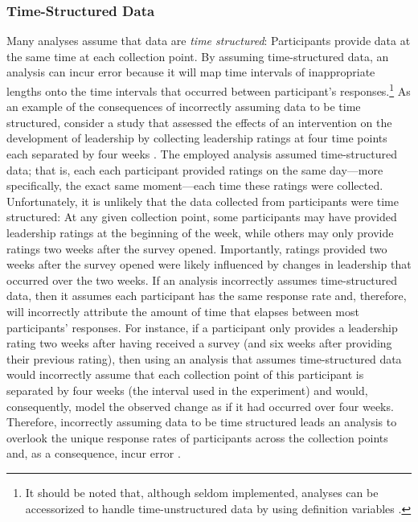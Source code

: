 \documentclass[
12pt, %
twoside,
english]{guelphthesis}
\begin{document}
\hypertarget{time-structured-data}{%
\subsubsection{Time-Structured Data}\label{time-structured-data}}

Many analyses assume that data are \emph{time structured}: Participants provide data at the same time at each collection point. By assuming time-structured data, an analysis can incur error because it will map time intervals of inappropriate lengths onto the time intervals that occurred between participant's responses.\footnote{It should be noted that, although seldom implemented, analyses can be accessorized to handle time-unstructured data by using definition variables \parencites{mehta2000}{mehta2005}.} As an example of the consequences of incorrectly assuming data to be time structured, consider a study that assessed the effects of an intervention on the development of leadership by collecting leadership ratings at four time points each separated by four weeks \autocite{day2011}. The employed analysis assumed time-structured data; that is, each each participant provided ratings on the same day---more specifically, the exact same moment---each time these ratings were collected. Unfortunately, it is unlikely that the data collected from participants were time structured: At any given collection point, some participants may have provided leadership ratings at the beginning of the week, while others may only provide ratings two weeks after the survey opened. Importantly, ratings provided two weeks after the survey opened were likely influenced by changes in leadership that occurred over the two weeks. If an analysis incorrectly assumes time-structured data, then it assumes each participant has the same response rate and, therefore, will incorrectly attribute the amount of time that elapses between most participants' responses. For instance, if a participant only provides a leadership rating two weeks after having received a survey (and six weeks after providing their previous rating), then using an analysis that assumes time-structured data would incorrectly assume that each collection point of this participant is separated by four weeks (the interval used in the experiment) and would, consequently, model the observed change as if it had occurred over four weeks. Therefore, incorrectly assuming data to be time structured leads an analysis to overlook the unique response rates of participants across the collection points and, as a consequence, incur error \autocite{mehta2000,mehta2005,coulombe2016}.
\end{document}
